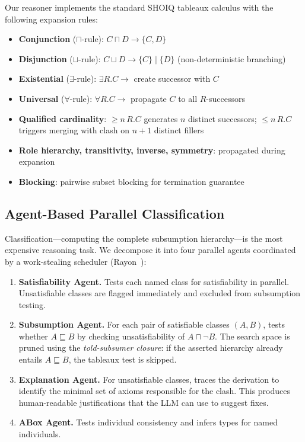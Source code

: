 \documentclass[runningheads]{llncs}
\begin{document}
Our reasoner implements the standard SHOIQ tableaux calculus with the following expansion rules:

\begin{itemize}
    \item \textbf{Conjunction} ($\sqcap$-rule): $C \sqcap D \to \{C, D\}$
    \item \textbf{Disjunction} ($\sqcup$-rule): $C \sqcup D \to \{C\} \mid \{D\}$ (non-deterministic branching)
    \item \textbf{Existential} ($\exists$-rule): $\exists R.C \to$ create successor with $C$
    \item \textbf{Universal} ($\forall$-rule): $\forall R.C \to$ propagate $C$ to all $R$-successors
    \item \textbf{Qualified cardinality}: $\geq n\, R.C$ generates $n$ distinct successors; $\leq n\, R.C$ triggers merging with clash on $n{+}1$ distinct fillers
    \item \textbf{Role hierarchy, transitivity, inverse, symmetry}: propagated during expansion
    \item \textbf{Blocking}: pairwise subset blocking for termination guarantee
\end{itemize}

\subsection{Agent-Based Parallel Classification}

Classification—computing the complete subsumption hierarchy—is the most expensive reasoning task. We decompose it into four parallel agents coordinated by a work-stealing scheduler (Rayon~\cite{rayon}):

\begin{enumerate}
    \item \textbf{Satisfiability Agent.} Tests each named class for satisfiability in parallel. Unsatisfiable classes are flagged immediately and excluded from subsumption testing.

    \item \textbf{Subsumption Agent.} For each pair of satisfiable classes $(A, B)$, tests whether $A \sqsubseteq B$ by checking unsatisfiability of $A \sqcap \neg B$. The search space is pruned using the \emph{told-subsumer closure}: if the asserted hierarchy already entails $A \sqsubseteq B$, the tableaux test is skipped.

    \item \textbf{Explanation Agent.} For unsatisfiable classes, traces the derivation to identify the minimal set of axioms responsible for the clash. This produces human-readable justifications that the LLM can use to suggest fixes.

    \item \textbf{ABox Agent.} Tests individual consistency and infers types for named individuals.
\end{enumerate}
\end{document}
